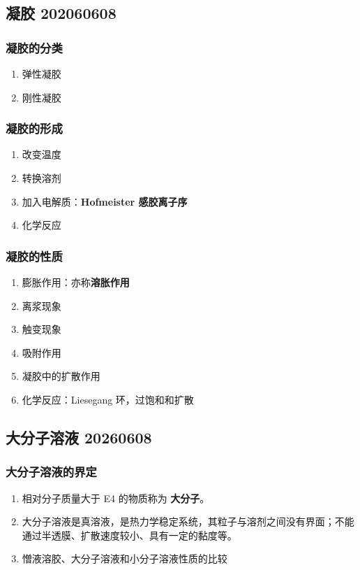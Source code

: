 \subsection{凝胶 202060608}

\subsubsection{凝胶的分类}

\begin{enumerate}
    \item 弹性凝胶
    \item 刚性凝胶
\end{enumerate}

\subsubsection{凝胶的形成}

\begin{enumerate}
    \item 改变温度
    \item 转换溶剂
    \item 加入电解质：\textbf{Hofmeister 感胶离子序}
    \item 化学反应
\end{enumerate}

\subsubsection{凝胶的性质}

\begin{enumerate}
    \item 膨胀作用：亦称\textbf{溶胀作用}
    \item 离浆现象
    \item 触变现象
    \item 吸附作用
    \item 凝胶中的扩散作用
    \item 化学反应：Liesegang 环，过饱和和扩散
\end{enumerate}

\subsection{大分子溶液 20260608}

\subsubsection{大分子溶液的界定}

\begin{enumerate}
    \item 相对分子质量大于 \qty{E4}{} 的物质称为 \textbf{大分子}。
    \item 大分子溶液是真溶液，是热力学稳定系统，其粒子与溶剂之间没有界面；不能通过半透膜、扩散速度较小、具有一定的黏度等。
    \item 憎液溶胶、大分子溶液和小分子溶液性质的比较
    
\end{enumerate}